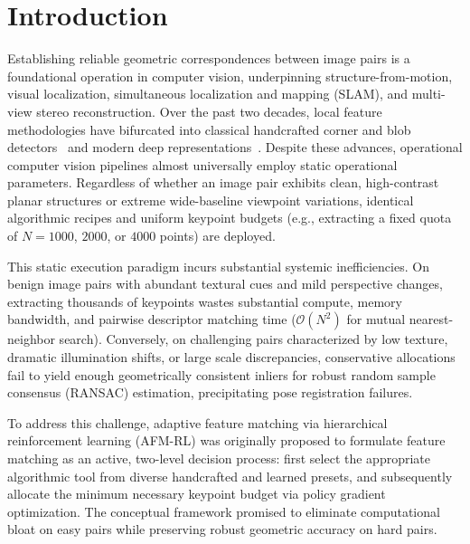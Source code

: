 \documentclass[conference]{IEEEtran}
\begin{document}
\section{Introduction}
\label{sec:intro}

Establishing reliable geometric correspondences between image pairs is a foundational operation in computer vision, underpinning structure-from-motion, visual localization, simultaneous localization and mapping (SLAM), and multi-view stereo reconstruction. Over the past two decades, local feature methodologies have bifurcated into classical handcrafted corner and blob detectors~\cite{lowe2004sift,rublee2011orb,bay2006surf,alcantarilla2012kaze,alcantarilla2013akaze,leutenegger2011brisk,alahi2012freak} and modern deep representations~\cite{detone2018superpoint,dusmanu2019d2net,tyszkiewicz2020disk,zhao2023aliked,edstedt2024dedode,potje2024xfeat,sarlin2020superglue,lindenberger2023lightglue,sun2021loftr}. Despite these advances, operational computer vision pipelines almost universally employ static operational parameters. Regardless of whether an image pair exhibits clean, high-contrast planar structures or extreme wide-baseline viewpoint variations, identical algorithmic recipes and uniform keypoint budgets (e.g., extracting a fixed quota of $N = 1000$, $2000$, or $4000$ points) are deployed.

This static execution paradigm incurs substantial systemic inefficiencies. On benign image pairs with abundant textural cues and mild perspective changes, extracting thousands of keypoints wastes substantial compute, memory bandwidth, and pairwise descriptor matching time ($\mathcal{O}(N^2)$ for mutual nearest-neighbor search). Conversely, on challenging pairs characterized by low texture, dramatic illumination shifts, or large scale discrepancies, conservative allocations fail to yield enough geometrically consistent inliers for robust random sample consensus (RANSAC) estimation, precipitating pose registration failures.

To address this challenge, adaptive feature matching via hierarchical reinforcement learning (AFM-RL) was originally proposed to formulate feature matching as an active, two-level decision process: first select the appropriate algorithmic tool from diverse handcrafted and learned presets, and subsequently allocate the minimum necessary keypoint budget via policy gradient optimization. The conceptual framework promised to eliminate computational bloat on easy pairs while preserving robust geometric accuracy on hard pairs.
\end{document}

